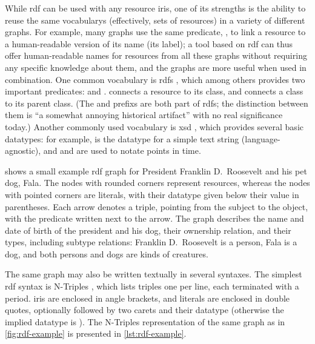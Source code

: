 While \gls{rdf} can be used with any \gls{resource} \glspl{iri},
one of its strengths is the ability to reuse the same \glspl{vocabulary}
(effectively, sets of \glspl{resource})
in a variety of different graphs.
For example, many graphs use the same \gls{predicate}, ,
to link a \gls{resource} to a human-readable version of its name (its label);
a tool based on \gls{rdf} can thus offer human-readable names for \glspl{resource} from all these graphs
without requiring any specific knowledge about them,
and the graphs are more useful when used in combination.
One common \gls{vocabulary} is \acrfull{rdfs} \cite{Guha:14:RS},
which among others provides two important predicates:
 and .
 connects a \gls{resource} to its class,
and  connects a class to its parent class.
(The  and  \glspl{prefix} are both part of \acrlong{rdfs};
the distinction between them is “a somewhat annoying historical artifact” \cite{Schreiber:14:RP}
with no real significance today.)
Another commonly used \gls{vocabulary} is \gls{xsd} \cite{Malhotra:04:XSP},
which provides several basic datatypes:
for example,  is the datatype for a simple text string (language-agnostic),
and  and  are used to notate points in time.

 shows a small example \gls{rdf} graph
for President Franklin D.~Roosevelt and his pet dog, Fala.
The nodes with rounded corners represent \glspl{resource},
whereas the nodes with pointed corners are literals,
with their datatype given below their value in parentheses.
Each arrow denotes a \gls{triple}, pointing from the \gls{subject} to the \gls{object},
with the \gls{predicate} written next to the arrow.
The graph describes the name and date of birth of the president and his dog,
their ownership relation,
and their types, including subtype relations:
Franklin D.~Roosevelt is a person, Fala is a dog,
and both persons and dogs are kinds of creatures.

The same graph may also be written textually in several syntaxes.
The simplest \gls{rdf} syntax is \gls{N-Triples} \cite{Seaborne:14:RN},
which lists \glspl{triple} one per line, each terminated with a period.
\Glspl{iri} are enclosed in angle brackets,
and literals are enclosed in double quotes,
optionally followed by two carets and their datatype
(otherwise the implied datatype is ).
The \gls{N-Triples} representation of the same graph as in \cref{fig:rdf-example}
is presented in \cref{lst:rdf-example}.

